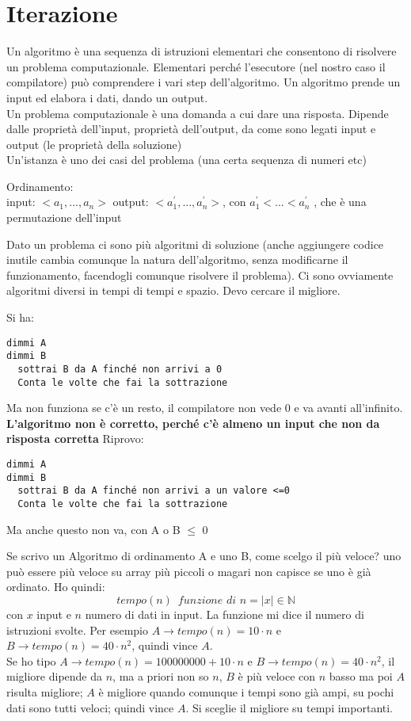 \documentclass[a4paper,12pt,oneside,tikz]{book}
\begin{document}
\chapter{Iterazione}
\begin{definizione}
	Un algoritmo è una sequenza di istruzioni elementari che consentono di risolvere un problema computazionale. Elementari perché l'esecutore (nel nostro caso il compilatore) può comprendere i vari step dell'algoritmo. Un algoritmo prende un input ed elabora i dati, dando un output.\\
	Un problema computazionale è una domanda a cui dare una risposta. Dipende dalle proprietà dell'input, proprietà dell'output, da come sono legati input e output (le proprietà della soluzione)\\
	Un'istanza è uno dei casi del problema (una certa sequenza di numeri etc)
\end{definizione}
\begin{esempio}
	Ordinamento:\\
	input: $<a_1,...,a_n>$
	output: $<a^{'}_1,...,a^{'}_n>$, con $a^{'}_1<...<a^{'}_n$ , che è una permutazione dell'input
\end{esempio}
Dato un problema ci sono più algoritmi di soluzione (anche aggiungere codice inutile cambia comunque la natura dell'algoritmo, senza modificarne il funzionamento, facendogli comunque risolvere il problema). Ci sono ovviamente algoritmi diversi in tempi di tempi e spazio. Devo cercare il migliore.
\begin{esempio}[divisione]
	Si ha:
	\begin{verbatim}
dimmi A
dimmi B
  sottrai B da A finché non arrivi a 0
  Conta le volte che fai la sottrazione
\end{verbatim}
	Ma non funziona se c'è un resto, il compilatore non vede 0 e va avanti all'infinito. \textbf{L'algoritmo non è corretto, perché c'è almeno un input che non da risposta corretta}
	\newpage
	Riprovo:
	\begin{verbatim}
dimmi A
dimmi B
  sottrai B da A finché non arrivi a un valore <=0
  Conta le volte che fai la sottrazione
\end{verbatim}
	Ma anche questo non va, con A o B $\leq$ 0
\end{esempio}
Se scrivo un Algoritmo di ordinamento A e uno B, come scelgo il più veloce? uno può essere più veloce su array più piccoli o magari non capisce se uno è già ordinato. Ho quindi:
$$tempo(n)\,\,\, funzione \,\, di \,\, n=|x|\in\mathbb{N}$$
con $x$ input e $n$ numero di dati in input. La funzione mi dice il numero di istruzioni svolte. Per esempio $A\rightarrow tempo(n)=10\cdot n$ e $B\rightarrow tempo(n)=40\cdot n^2$, quindi vince $A$.\\ Se ho tipo $A\rightarrow tempo(n)=100000000+10\cdot n$ e $B\rightarrow tempo(n)=40\cdot n^2$, il migliore dipende da $n$, ma a priori non so $n$, $B$ è più veloce con $n$ basso ma poi $A$ risulta migliore; $A$ è migliore quando comunque i tempi sono già ampi, su pochi dati sono tutti veloci; quindi vince $A$. Si sceglie il migliore su tempi importanti. \\
\end{document}
